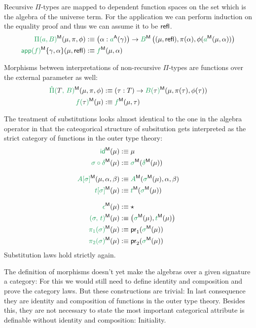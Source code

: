 Recursive $\Pi$-types are mapped to dependent function spaces on the
set which is the algebra of the universe term.
For the application we can perform induction on the equality proof and
thus we can assume it to be $\mathsf{refl}$.
\begin{align*}
\grm{\Pi(a, B)}^\MM(\mu, \pi, \phi)
  &:\equiv \left(\alpha : \grm{a}^\CC(\gamma)\right)
    \to \grm{B}^\MM\left((\mu, \refl), \pi(\alpha), \phi(\grm{a}^\MM(\mu, \alpha))\right) \\
\grm{\IIapp(f)}^\MM\{\gamma, \alpha\}(\mu, \refl)
  &:\equiv \grm{f}^\MM(\mu, \alpha)
\end{align*}

Morphisms between interpretations of non-recursive $\Pi$-types are functions over
the external parameter as well:
\begin{align*}
\grm{\ExtPi{T}{B}}^\MM(\mu, \pi, \phi)
  &:\equiv (\tau : T) \to \grm{B(\bltau)}^\MM(\mu, \pi(\tau), \phi(\tau)) \\
\grm{f(\bltau)}^\MM(\mu)
  &:\equiv \grm{f}^\MM(\mu, \tau)
\end{align*}

The treatment of substitutions looks almost identical to the one in the algebra
operator in that the cateogorical structure of subsitution gets interpreted
as the strict category of functions in the outer type theory:
\begin{align*}
\grm{\id}^\MM(\mu)
  &:\equiv \mu \\
\grm{\sigma \circ \delta}^\MM(\mu)
  &:\equiv \grm{\sigma}^\MM(\grm{\delta}^\MM(\mu)) \\[.7em]
\grm{A[\sigma]}^\MM(\mu, \alpha, \beta)
  &:\equiv \grm{A}^\MM(\grm{\sigma}^\MM(\mu), \alpha, \beta) \\
\grm{t[\sigma]}^\MM(\mu)
  &:\equiv \grm{t}^\MM(\grm{\sigma}^\MM(\mu)) \\[.7em]
\grm{\epsilon}^\MM(\mu)
  &:\equiv \star \\
\grm{(\sigma,\,t)}^\MM(\mu)
  &:\equiv \left(\grm{\sigma}^\MM(\mu), \grm{t}^\MM(\mu)\right) \\
\grm{\pi_1(\sigma)}^\MM(\mu)
  &:\equiv \pr_1(\grm{\sigma}^\MM(\mu)) \\
\grm{\pi_2(\sigma)}^\MM(\mu)
  &:\equiv \pr_2(\grm{\sigma}^\MM(\mu))
\end{align*}
Substitution laws hold strictly again.

The definition of morphisms doesn't yet make the algebras over a given
signature \grm{\Gamma} a category: For this we would still need to define
identity and composition and prove the category laws.
But these constructions are trivial: In last consequence
they are identity and composition of functions in the outer type theory.
Besides this, they are not necessary to state the most important categorical attribute
is definable without identity and composition:
Initiality.

